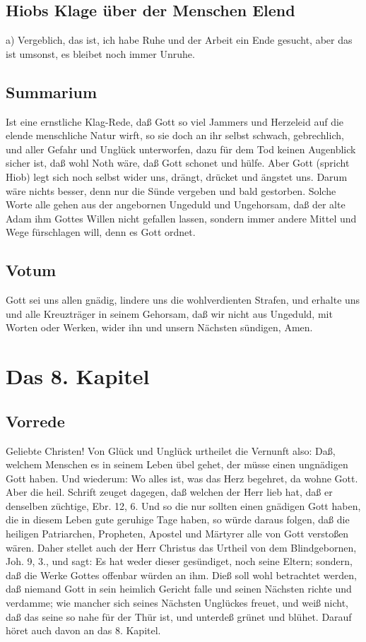 \section{Hiobs Klage über der Menschen Elend}

a) Vergeblich, das ist, ich habe Ruhe und der Arbeit ein Ende gesucht, aber das ist umsonst, es bleibet noch immer Unruhe.

\section{Summarium}

Ist eine ernstliche Klag-Rede, daß Gott so viel Jammers und Herzeleid auf die elende menschliche Natur wirft, so sie doch an ihr selbst schwach, gebrechlich, und aller Gefahr und Unglück unterworfen, dazu für dem Tod keinen Augenblick sicher ist, daß wohl Noth wäre, daß Gott schonet und hülfe. Aber Gott (spricht Hiob) legt sich noch selbst wider uns, drängt, drücket und ängstet uns. Darum wäre nichts besser, denn nur die Sünde vergeben und bald gestorben. Solche Worte alle gehen aus der angebornen Ungeduld und Ungehorsam, daß der alte Adam ihm Gottes Willen nicht gefallen lassen, sondern immer andere Mittel und Wege fürschlagen will, denn es Gott ordnet.

\section{Votum}

Gott sei uns allen gnädig, lindere uns die wohlverdienten Strafen, und erhalte uns und alle Kreuzträger in seinem Gehorsam, daß wir nicht aus Ungeduld, mit Worten oder Werken, wider ihn und unsern Nächsten sündigen, Amen.

\chapter{Das 8. Kapitel}

\section{Vorrede}

Geliebte Christen! Von Glück und Unglück urtheilet die Vernunft also: Daß, welchem Menschen es in seinem Leben übel gehet, der müsse einen ungnädigen Gott haben. Und wiederum: Wo alles ist, was das Herz begehret, da wohne Gott. Aber die heil. Schrift zeuget dagegen, daß welchen der Herr lieb hat, daß er denselben züchtige, Ebr. 12, 6. Und so die nur sollten einen gnädigen Gott haben, die in diesem Leben gute geruhige Tage haben, so würde daraus folgen, daß die heiligen Patriarchen, Propheten, Apostel und Märtyrer alle von Gott verstoßen wären. Daher stellet auch der Herr Christus das Urtheil von dem Blindgebornen, Joh. 9, 3., und sagt: Es hat weder dieser gesündiget, noch seine Eltern; sondern, daß die Werke Gottes offenbar würden an ihm. Dieß soll wohl betrachtet werden, daß niemand Gott in sein heimlich Gericht falle und seinen Nächsten richte und verdamme; wie mancher sich seines Nächsten Unglückes freuet, und weiß nicht, daß das seine so nahe für der Thür ist, und unterdeß grünet und blühet. Darauf höret auch davon an das 8. Kapitel.

